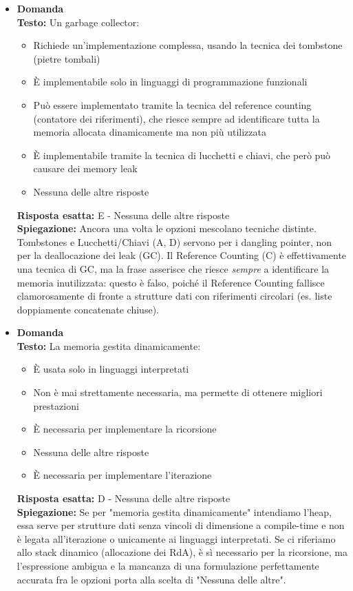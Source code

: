 \documentclass[12pt, a4paper]{article}
\newcounter{domandateoria}
\begin{document}
\begin{itemize}
    \item {}\textbf{Domanda \thedomandateoria} \\
    \textbf{Testo:} Un garbage collector:
    \begin{itemize}
        \item[A)] Richiede un'implementazione complessa, usando la tecnica dei tombstone (pietre tombali)
        \item[B)] È implementabile solo in linguaggi di programmazione funzionali
        \item[C)] Può essere implementato tramite la tecnica del reference counting (contatore dei riferimenti), che riesce sempre ad identificare tutta la memoria allocata dinamicamente ma non più utilizzata
        \item[D)] È implementabile tramite la tecnica di lucchetti e chiavi, che però può causare dei memory leak
        \item[E)] Nessuna delle altre risposte
    \end{itemize}
    \textbf{Risposta esatta:} E - Nessuna delle altre risposte \\
    \textbf{Spiegazione:} Ancora una volta le opzioni mescolano tecniche distinte. Tombstones e Lucchetti/Chiavi (A, D) servono per i dangling pointer, non per la deallocazione dei leak (GC). Il Reference Counting (C) è effettivamente una tecnica di GC, ma la frase asserisce che riesce \textit{sempre} a identificare la memoria inutilizzata: questo è falso, poiché il Reference Counting fallisce clamorosamente di fronte a strutture dati con riferimenti circolari (es. liste doppiamente concatenate chiuse).
    \vspace{0.3cm}

    \item {}\textbf{Domanda \thedomandateoria} \\
    \textbf{Testo:} La memoria gestita dinamicamente:
    \begin{itemize}
        \item[A)] È usata solo in linguaggi interpretati
        \item[B)] Non è mai strettamente necessaria, ma permette di ottenere migliori prestazioni
        \item[C)] È necessaria per implementare la ricorsione
        \item[D)] Nessuna delle altre risposte
        \item[E)] È necessaria per implementare l'iterazione
    \end{itemize}
    \textbf{Risposta esatta:} D - Nessuna delle altre risposte \\
    \textbf{Spiegazione:} Se per "memoria gestita dinamicamente" intendiamo l'heap, essa serve per strutture dati senza vincoli di dimensione a compile-time e non è legata all'iterazione o unicamente ai linguaggi interpretati. Se ci riferiamo allo stack dinamico (allocazione dei RdA), è sì necessario per la ricorsione, ma l'espressione ambigua e la mancanza di una formulazione perfettamente accurata fra le opzioni porta alla scelta di "Nessuna delle altre".
    \vspace{0.3cm}
\end{itemize}
\end{document}
